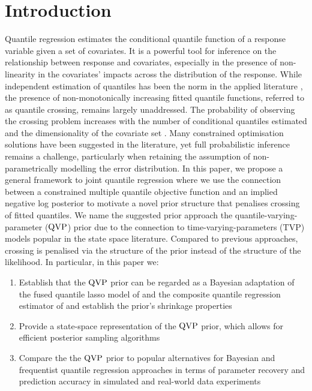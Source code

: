 \section{Introduction}
Quantile regression estimates the conditional quantile function of a response variable given a set of covariates. It is a powerful tool for inference on the relationship between response and covariates, especially in the presence of non-linearity in the covariates' impacts across the distribution of the response. While independent estimation of quantiles has been the norm in the applied literature \citep{koenker2005}, the presence of non-monotonically increasing fitted quantile functions, referred to as quantile crossing, remains largely unaddressed. 
%
The probability of observing the crossing problem increases with the number of conditional quantiles estimated and the dimensionality of the covariate set \citet{wang2024composite}. Many constrained optimisation solutions have been suggested in the literature, yet full probabilistic inference remains a challenge, particularly when retaining the assumption of non-parametrically modelling the error distribution. In this paper, we propose a general framework to joint quantile regression where we use the connection between a constrained multiple quantile objective function and an implied negative log posterior to motivate a novel prior structure that penalises crossing of fitted quantiles. We name the suggested prior approach the quantile-varying-parameter ($\operatorname{QVP}$) prior due to the connection to time-varying-parameters ($\mathrm{TVP}$) models popular in the state space literature.  Compared to previous approaches, crossing is penalised via the structure of the prior instead of the structure of the likelihood. In particular, in this paper we:
%
\begin{enumerate}
    \item Establish that the $\operatorname{QVP}$ prior can be regarded as a Bayesian adaptation of the fused quantile lasso model of \citet{jiang2013interquantile} and the composite quantile regression estimator of \citet{zou2008composite} and establish the prior's shrinkage properties
    \item Provide a state-space representation of the $\operatorname{QVP}$ prior, which allows for efficient posterior sampling algorithms 
    \item Compare the the $\operatorname{QVP}$ prior to popular alternatives for Bayesian and frequentist quantile regression approaches in terms of parameter recovery and prediction accuracy in simulated and real-world data experiments
\end{enumerate}
